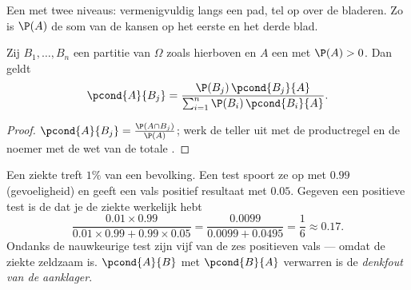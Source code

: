 \begin{omfigure}

{\small Een  met twee niveaus: vermenigvuldig langs een pad, tel op
over de bladeren. Zo is $\P(A)$ de som van de kansen op het eerste en het
derde blad.}
\end{omfigure}

\begin{theorem}\label{thm:g12:condprob:bayes}
Zij $B_1, \dots, B_n$ een partitie van $\Omega$ zoals hierboven en $A$ een
 met $\P(A) > 0$. Dan geldt
\[
\pcond{A}{B_j} =
\frac{\P(B_j)\,\pcond{B_j}{A}}{\sum_{i=1}^{n} \P(B_i)\,\pcond{B_i}{A}} .
\]
\end{theorem}

\begin{proof}
$\pcond{A}{B_j} = \frac{\P(A \cap B_j)}{\P(A)}$; werk de teller uit met de
productregel en de noemer met de wet van de totale .
\end{proof}

\begin{example}[Screeningstest]\label{ex:g12:condprob:test}
Een ziekte treft $1\%$ van een bevolking. Een test spoort ze op met 
$0.99$ (gevoeligheid) en geeft een vals positief resultaat met  $0.05$.
Gegeven een positieve test is de  dat je de ziekte werkelijk hebt
\[
\frac{0.01 \times 0.99}{0.01\times0.99 + 0.99\times0.05}
= \frac{0.0099}{0.0099 + 0.0495} = \frac{1}{6} \approx 0.17 .
\]
Ondanks de nauwkeurige test zijn vijf van de zes positieven vals --- omdat de
ziekte zeldzaam is. $\pcond{A}{B}$ met $\pcond{B}{A}$ verwarren is de
\emph{denkfout van de aanklager}.
\end{example}

